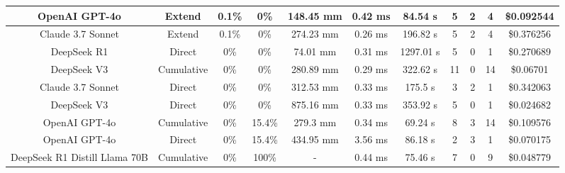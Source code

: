 \begin{landscape}
\begin{table}[H]
\begin{center}
\begin{tabular}{|c|c|c|c|c|c|c|c|c|c|c|}
    \hline
    OpenAI GPT-4o & Extend & 0.1\% & 0\% & 148.45 mm & 0.42 ms & 84.54 s & 5 & 2 & 4 & \$0.092544 \\
    \hline
    Claude 3.7 Sonnet & Extend & 0.1\% & 0\% & 274.23 mm & 0.26 ms & 196.82 s & 5 & 2 & 4 & \$0.376256 \\
    \hline
    DeepSeek R1 & Direct & 0\% & 0\% & 74.01 mm & 0.31 ms & 1297.01 s & 5 & 0 & 1 & \$0.270689 \\
    \hline
    DeepSeek V3 & Cumulative & 0\% & 0\% & 280.89 mm & 0.29 ms & 322.62 s & 11 & 0 & 14 & \$0.06701 \\
    \hline
    Claude 3.7 Sonnet & Direct & 0\% & 0\% & 312.53 mm & 0.33 ms & 175.5 s & 3 & 2 & 1 & \$0.342063 \\
    \hline
    DeepSeek V3 & Direct & 0\% & 0\% & 875.16 mm & 0.33 ms & 353.92 s & 5 & 0 & 1 & \$0.024682 \\
    \hline
    OpenAI GPT-4o & Cumulative & 0\% & 15.4\% & 279.3 mm & 0.34 ms & 69.24 s & 8 & 3 & 14 & \$0.109576 \\
    \hline
    OpenAI GPT-4o & Direct & 0\% & 15.4\% & 434.95 mm & 3.56 ms & 86.18 s & 2 & 3 & 1 & \$0.070175 \\
    \hline
    DeepSeek R1 Distill Llama 70B & Cumulative & 0\% & 100\% & - & 0.44 ms & 75.46 s & 7 & 0 & 9 & \$0.048779 \\
    \hline
\end{tabular}
\label{Results-Position-2-5}
\end{center}
\end{table}


\end{landscape}
